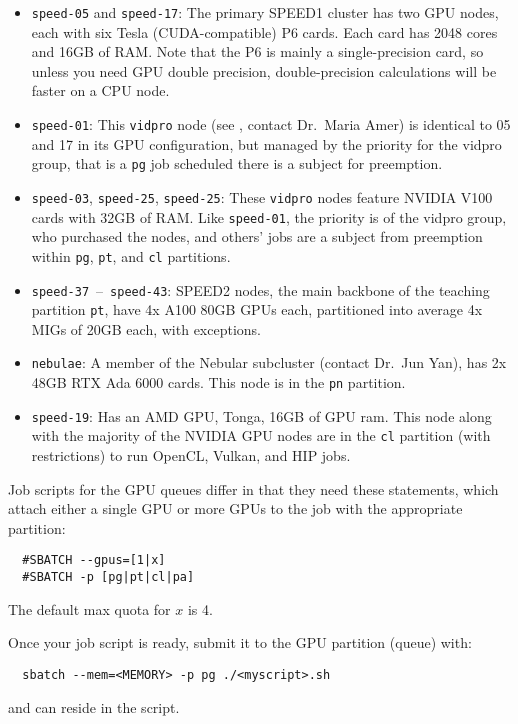 \begin{itemize}
	\item \texttt{speed-05} and \texttt{speed-17}:
The primary SPEED1 cluster has two GPU nodes, each with six Tesla (CUDA-compatible) P6
cards. Each card has 2048 cores and 16GB of RAM. Note that the P6
is mainly a single-precision card, so unless you need GPU double precision, 
double-precision calculations will be faster on a CPU node.
	\item \texttt{speed-01}:
This \texttt{vidpro} node (see , contact Dr.~Maria Amer) is identical
to 05 and 17 in its GPU configuration, but managed by the priority
for the vidpro group, that is a \texttt{pg} job scheduled there
is a subject for preemption.
	\item \texttt{speed-03}, \texttt{speed-25}, \texttt{speed-25}:
These \texttt{vidpro} nodes feature NVIDIA V100 cards with 32GB of RAM.
Like \texttt{speed-01}, the priority is of the vidpro group, who
purchased the nodes, and others' jobs are a subject from preemption
within \texttt{pg}, \texttt{pt}, and \texttt{cl} partitions.
	\item \texttt{speed-37}~--~\texttt{speed-43}:
SPEED2 nodes, the main backbone of the teaching partition \texttt{pt},
have 4x A100 80GB GPUs each, partitioned into average 4x MIGs of 20GB
each, with exceptions.
	\item \texttt{nebulae}:
A member of the Nebular subcluster (contact Dr.~Jun Yan), has 2x 48GB
RTX Ada 6000 cards. This node is in the \texttt{pn} partition.
	\item \texttt{speed-19}:
Has an AMD GPU, Tonga, 16GB of GPU ram.
This node along with the majority of the NVIDIA GPU nodes are in the
\texttt{cl} partition (with restrictions) to run OpenCL, Vulkan,
and HIP jobs.
\end{itemize}

\noindent
Job scripts for the GPU queues differ in that they need these statements,
which attach either a single GPU or more GPUs to the job with the
appropriate partition:
\begin{verbatim}
  #SBATCH --gpus=[1|x]
  #SBATCH -p [pg|pt|cl|pa]
\end{verbatim}
The default max quota for $x$ is 4.

\noindent
Once your job script is ready, submit it to the GPU partition (queue) with:
\begin{verbatim}
  sbatch --mem=<MEMORY> -p pg ./<myscript>.sh
\end{verbatim}
 and  can reside in the script.

